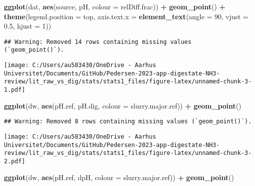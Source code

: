 \documentclass[
]{article}
\newenvironment{Shaded}{\begin{snugshade}}{\end{snugshade}}
\newcommand{\AttributeTok}[1]{\textcolor[rgb]{0.13,0.29,0.53}{#1}}
\newcommand{\DecValTok}[1]{\textcolor[rgb]{0.00,0.00,0.81}{#1}}
\newcommand{\FloatTok}[1]{\textcolor[rgb]{0.00,0.00,0.81}{#1}}
\newcommand{\FunctionTok}[1]{\textcolor[rgb]{0.13,0.29,0.53}{\textbf{#1}}}
\newcommand{\NormalTok}[1]{#1}
\newcommand{\SpecialCharTok}[1]{\textcolor[rgb]{0.81,0.36,0.00}{\textbf{#1}}}
\newcommand{\StringTok}[1]{\textcolor[rgb]{0.31,0.60,0.02}{#1}}
\begin{document}
\begin{Shaded}
\begin{Highlighting}[]
\FunctionTok{ggplot}\NormalTok{(dat, }\FunctionTok{aes}\NormalTok{(source, pH, }\AttributeTok{colour =}\NormalTok{ relDiff.frac)) }\SpecialCharTok{+}
  \FunctionTok{geom\_point}\NormalTok{() }\SpecialCharTok{+}
  \FunctionTok{theme}\NormalTok{(}\AttributeTok{legend.position =} \StringTok{\textquotesingle{}top\textquotesingle{}}\NormalTok{, }\AttributeTok{axis.text.x =} \FunctionTok{element\_text}\NormalTok{(}\AttributeTok{angle =} \DecValTok{90}\NormalTok{, }\AttributeTok{vjust =} \FloatTok{0.5}\NormalTok{, }\AttributeTok{hjust =} \DecValTok{1}\NormalTok{))}
\end{Highlighting}
\end{Shaded}

\begin{verbatim}
## Warning: Removed 14 rows containing missing values (`geom_point()`).
\end{verbatim}

\texttt{[image: C:/Users/au583430/OneDrive - Aarhus Universitet/Documents/GitHub/Pedersen-2023-app-digestate-NH3-review/lit\_raw\_vs\_dig/stats/stats1\_files/figure-latex/unnamed-chunk-3-1.pdf]}

\begin{Shaded}
\begin{Highlighting}[]
\FunctionTok{ggplot}\NormalTok{(dw, }\FunctionTok{aes}\NormalTok{(pH.ref, pH.dig, }\AttributeTok{colour =}\NormalTok{ slurry.major.ref)) }\SpecialCharTok{+}
  \FunctionTok{geom\_point}\NormalTok{()}
\end{Highlighting}
\end{Shaded}

\begin{verbatim}
## Warning: Removed 8 rows containing missing values (`geom_point()`).
\end{verbatim}

\texttt{[image: C:/Users/au583430/OneDrive - Aarhus Universitet/Documents/GitHub/Pedersen-2023-app-digestate-NH3-review/lit\_raw\_vs\_dig/stats/stats1\_files/figure-latex/unnamed-chunk-3-2.pdf]}

\begin{Shaded}
\begin{Highlighting}[]
\FunctionTok{ggplot}\NormalTok{(dw, }\FunctionTok{aes}\NormalTok{(pH.ref, dpH, }\AttributeTok{colour =}\NormalTok{ slurry.major.ref)) }\SpecialCharTok{+}
  \FunctionTok{geom\_point}\NormalTok{()}
\end{Highlighting}
\end{Shaded}
\end{document}
